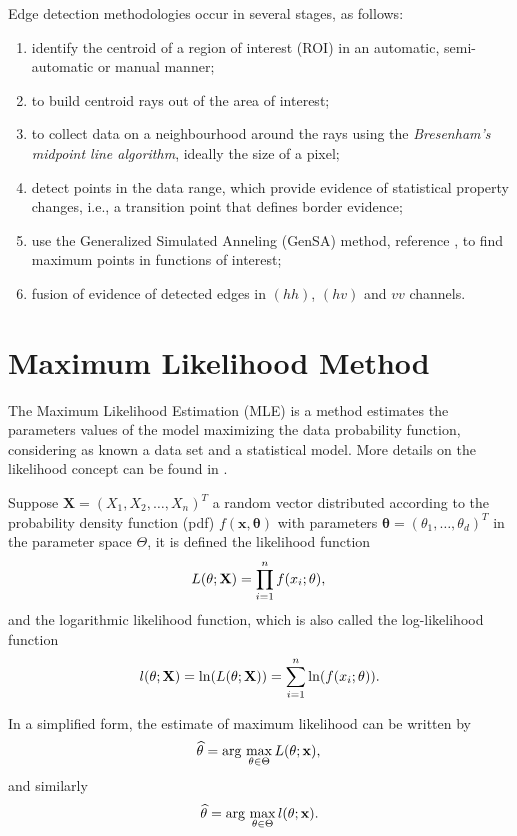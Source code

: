 \documentclass[conference]{IEEEtran}
\begin{document}
Edge detection methodologies occur in several stages, as follows:
\begin{enumerate}
	\item identify the centroid of a region of interest (ROI) in an automatic, semi-automatic or manual manner;
	\item to build centroid rays out of the area of interest;
	\item to collect data on a neighbourhood around the rays using the {\it Bresenham's midpoint line algorithm}, ideally the size of a pixel;
	\item detect points in the data range, which provide evidence of statistical property changes, i.e., a transition point that defines border evidence;
	\item use the Generalized Simulated Anneling (GenSA) method, reference \cite{xgsh}, to find maximum points in functions of interest;
	\item fusion of evidence of detected edges in $(hh)$, $(hv)$ and $vv$ channels.
\end{enumerate}

\section{Maximum Likelihood Method}\label{sec_05}
The Maximum Likelihood Estimation (MLE) is a method estimates the parameters values of the model maximizing the data probability function, considering as known a data set and a statistical model. More details on the likelihood concept can be found in \cite{nhfc, gmbf}.

Suppose $\mathbf{X}=(X_1,X_2,\dots,X_n)^T$ a random vector distributed according to the probability density function (pdf) $f(\mathbf{x},\mathbf{\theta})$ with parameters $\mathbf{\theta}=(\theta_1,\dots,\theta_d)^T$ in the parameter space $\Theta$, it is defined the likelihood function  
\begin{equation*}
    L(\theta;\mathbf{X}) = \prod_{i=1}^{n}f(x_i;\theta), \\
\end{equation*}
and the logarithmic likelihood function, which is also called the log-likelihood function
\begin{equation}\label{eq_09}
	l(\theta;\mathbf{X})= \ln(L(\theta;\mathbf{X})) = \sum_{i=1}^{n}\ln(f(x_i;\theta)). \\
\end{equation}

In a simplified form, the estimate of maximum likelihood can be written by 
\begin{equation*}
    \widehat{\theta}= \text{arg}\,\max\limits_{\theta\in\Theta}L(\theta;\mathbf{x}),\\
\end{equation*}
and similarly
\begin{equation*}
    \widehat{\theta}= \text{arg}\,\max\limits_{\theta\in\Theta}l(\theta;\mathbf{x}).\\
\end{equation*}
\end{document}
